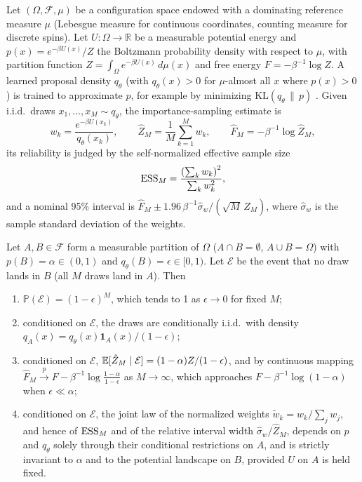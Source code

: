 Let $(\Omega, \mathcal{F}, \mu)$ be a configuration space endowed with a dominating reference measure $\mu$ (Lebesgue measure for continuous coordinates, counting measure for discrete spins). Let $U: \Omega \to \mathbb{R}$ be a measurable potential energy and $p(x)=e^{-\beta U(x)}/Z$ the Boltzmann probability density with respect to $\mu$, with partition function $Z = \int_\Omega e^{-\beta U(x)}\,d\mu(x)$ and free energy $F=-\beta^{-1}\log Z$. A learned proposal density $q_\theta$ (with $q_\theta(x) > 0$ for $\mu$-almost all $x$ where $p(x) > 0$) is trained to approximate $p$, for example by minimizing $\mathrm{KL}(q_\theta\,\|\,p)$ \citep{noe2019boltzmann}. Given i.i.d.\ draws $x_1,\dots,x_M\sim q_\theta$, the importance-sampling estimate is
\begin{equation}
w_k=\frac{e^{-\beta U(x_k)}}{q_\theta(x_k)},\qquad \hat Z_M=\frac1M\sum_{k=1}^M w_k,\qquad \hat F_M=-\beta^{-1}\log\hat Z_M,
\end{equation}
its reliability is judged by the self-normalized effective sample size
\begin{equation}
\mathrm{ESS}_M=\frac{\left(\sum_k w_k\right)^2}{\sum_k w_k^2},
\end{equation}
and a nominal 95\% interval is $\hat F_M\pm1.96\,\beta^{-1}\hat\sigma_w/(\sqrt M\,\hat Z_M)$, where $\hat\sigma_w$ is the sample standard deviation of the weights.

\begin{proposition}
\label{prop:unvisited}
Let $A, B \in \mathcal{F}$ form a measurable partition of $\Omega$ ($A \cap B = \emptyset$, $A \cup B = \Omega$) with $p(B)=\alpha \in (0, 1)$ and $q_\theta(B)=\epsilon \in [0, 1)$. Let $\mathcal E$ be the event that no draw lands in $B$ (all $M$ draws land in $A$). Then
\begin{enumerate}
\item $\mathbb P(\mathcal E)=(1-\epsilon)^M$, which tends to 1 as $\epsilon\to0$ for fixed $M$;
\item conditioned on $\mathcal E$, the draws are conditionally i.i.d.\ with density $q_A(x)=q_\theta(x)\mathbf{1}_A(x)/(1-\epsilon)$;
\item conditioned on $\mathcal E$, $\mathbb{E}[\hat Z_M\mid\mathcal E]=(1-\alpha)Z/(1-\epsilon)$, and by continuous mapping $\hat F_M \xrightarrow{p} F-\beta^{-1}\log\frac{1-\alpha}{1-\epsilon}$ as $M \to \infty$, which approaches $F-\beta^{-1}\log(1-\alpha)$ when $\epsilon \ll \alpha$;
\item conditioned on $\mathcal E$, the joint law of the normalized weights $\tilde{w}_k = w_k/\sum_jw_j$, and hence of $\mathrm{ESS}_M$ and of the relative interval width $\hat\sigma_w/\hat Z_M$, depends on $p$ and $q_\theta$ solely through their conditional restrictions on $A$, and is strictly invariant to $\alpha$ and to the potential landscape on $B$, provided $U$ on $A$ is held fixed.
\end{enumerate}
\end{proposition}

